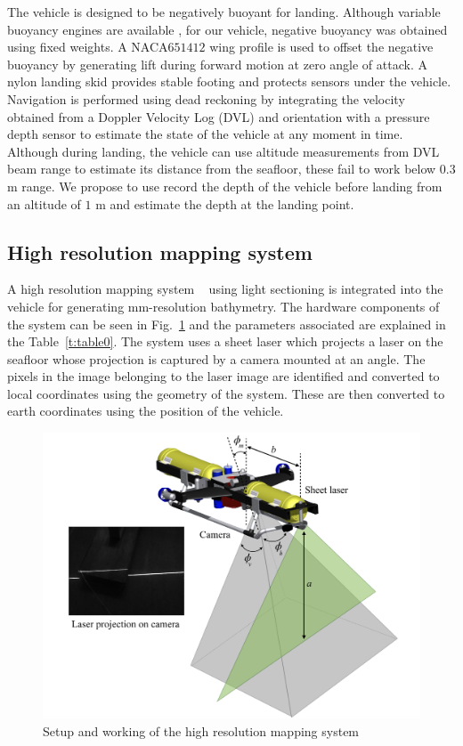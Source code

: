 The vehicle is designed to be negatively buoyant for landing. Although variable buoyancy engines are available \cite{Zhao2008}, for our vehicle, negative buoyancy was obtained using fixed weights. A NACA$651412$ wing profile is used to offset the negative buoyancy by generating lift during forward motion at zero angle of attack. A nylon landing skid provides stable footing and protects sensors under the vehicle. Navigation is performed using dead reckoning by integrating the velocity obtained from a Doppler Velocity Log (DVL) and orientation with a pressure depth sensor to estimate the state of the vehicle at any moment in time. Although during landing, the vehicle can use altitude measurements from DVL beam range to estimate its distance from the seafloor, these fail to work below $0.3$ m  range. We propose to use record the depth of the vehicle before landing from an altitude of $1$ m and  estimate the depth at the landing point. 

\subsection{High resolution mapping system}
\label{ssec:hres}

A high resolution mapping system ~\cite{Bodenmann2016} using light sectioning is integrated into the vehicle for generating mm-resolution bathymetry. The hardware components of the system can be seen in Fig.~\ref{f:mehul3} and the parameters associated are explained in the Table~\ref{t:table0}. The system uses a sheet laser which projects a laser on the seafloor whose projection is captured by a camera mounted at an angle. The pixels in the image belonging to the laser image are identified and converted to local coordinates using the geometry of the system. These are then converted to earth coordinates using the position of the vehicle. 

\begin{figure}[!ht]
\centering\includegraphics[width=4.7in]{./images/mehul3.png}
\caption{Setup and working of the high resolution mapping system}
\label{f:mehul3}
\end{figure}

